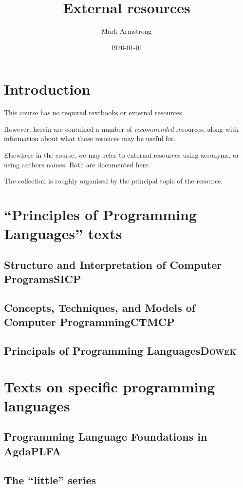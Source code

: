 \documentclass[11pt]{article}
\author{Mark Armstrong}
\date{\today}
\title{External resources}
\begin{document}
\maketitle
\tableofcontents


\section{Introduction}
\label{sec:org7041854}
This course has no required textbooks or external resources.

However, herein are contained a number of \emph{recommended} resources,
along with information about what those resouces may be useful for.

Elsewhere in the course, we may refer to external resources using acronyms,
or using authors names. Both are documented here.

The collection is roughly organised by the principal topic of the resource.

\section{“Principles of Programming Languages” texts}
\label{sec:org95eeb8e}
\subsection{Structure and Interpretation of Computer Programs\hfill{}\textsc{SICP}}
\label{sec:org5bb1aac}
\subsection{Concepts, Techniques, and Models of Computer Programming\hfill{}\textsc{CTMCP}}
\label{sec:org2da1cc1}
\subsection{Principals of Programming Languages\hfill{}\textsc{Dowek}}
\label{sec:orgec3725c}

\section{Texts on specific programming languages}
\label{sec:orgbf9fe26}
\subsection{Programming Language Foundations in Agda\hfill{}\textsc{PLFA}}
\label{sec:org66e6995}
\subsection{The “little” series}
\label{sec:orgdf74737}
\end{document}
